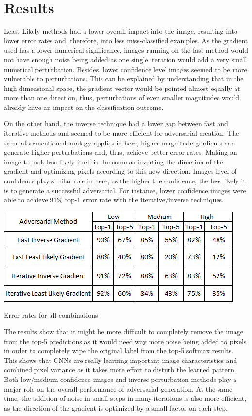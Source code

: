 \documentclass[10pt,journal,compsoc]{IEEEtran}
\begin{document}
\section{Results}
\label{sec:results}

Least Likely methods had a lower overall impact into the image, resulting into lower error rates and, therefore, into less miss-classified examples. As the gradient used has a lower numerical significance, images running on the fast method would not have enough noise being added as one single iteration would add a very small numerical perturbation. Besides, lower confidence level images seemed to be more vulnerable to perturbations. This can be explained by understanding that in the high dimensional space, the gradient vector would be pointed almost equally at more than one direction, thus, perturbations of even smaller magnitudes would already have an impact on the classification outcome.

On the other hand, the inverse technique had a lower gap between fast and iterative methods and seemed to be more efficient for adversarial creation. The same aforementioned analogy applies in here, higher magnitude gradients can generate higher perturbations and, thus, achieve better error rates. Making an image to look less likely itself is the same as inverting the direction of the gradient and optimizing pixels according to this new direction. Images level of confidence play similar role in here, as the higher the confidence, the less likely it is to generate a successful adversarial. For instance, lower confidence images were able to achieve 91\% top-1 error rate with the iterative/inverse techniques.
\begin{table}[h!]
\centering
	\includegraphics[scale=0.7]{results.png}
\caption{Error rates for all combinations}

\end{table}

The results show that it might be more difficult to completely remove the image from the top-5 predictions as it would need way more noise being added to pixels in order to completely wipe the original label from the top-5 softmax results. This shows that CNNs are really learning important image characteristics and combined pixel variance as it takes more effort to disturb the learned pattern. Both low/medium confidence images and inverse perturbation methods play a major role on the overall performance of adversarial generation. At the same time, the addition of noise in small steps in many iterations is also more efficient, as the direction of the gradient is optimized by a small factor on each step.
\end{document}
